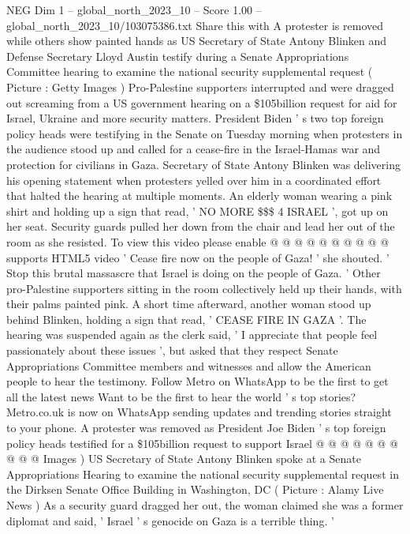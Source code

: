 \begin{textsample}{NEG Dim 1 – global\_north\_2023\_10 – Score 1.00 – global\_north\_2023\_10/103075386.txt}  \label{ex:f1_neg_315}
Share this with A protester is removed while others show painted hands as US Secretary of State Antony Blinken and Defense Secretary Lloyd Austin testify during a Senate Appropriations Committee hearing to examine the national security supplemental request ( Picture : Getty Images ) Pro-Palestine supporters interrupted and were dragged out screaming from a US government hearing on a \$105billion request for aid for Israel, Ukraine and more security matters.
President Biden ' s two top foreign policy heads were testifying in the Senate on Tuesday morning when protesters in the audience stood up and called for a cease-fire in the Israel-Hamas war and protection for civilians in Gaza.
Secretary of State Antony Blinken was delivering his opening statement when protesters yelled over him in a coordinated effort that halted the hearing at multiple moments.
An elderly woman wearing a pink shirt and holding up a sign that read, ' NO MORE \$\$\$ 4 ISRAEL ', got up on her seat.
Security guards pulled her down from the chair and lead her out of the room as she resisted.
To view this video please enable @ @ @ @ @ @ @ @ @ @ supports HTML5 video ' Cease fire now on the people of Gaza! ' she shouted. ' Stop this brutal massascre that Israel is doing on the people of Gaza. ' Other pro-Palestine supporters sitting in the room collectively held up their hands, with their palms painted pink.
A short time afterward, another woman stood up behind Blinken, holding a sign that read, ' CEASE FIRE IN GAZA '.
The hearing was suspended again as the clerk said, ' I appreciate that people feel passionately about these issues ', but asked that they respect Senate Appropriations Committee members and witnesses and allow the American people to hear the testimony.
Follow Metro on WhatsApp to be the first to get all the latest news Want to be the first to hear the world ' s top stories?
Metro.co.uk is now on WhatsApp sending updates and trending stories straight to your phone.
A protester was removed as President Joe Biden ' s top foreign policy heads testified for a \$105billion request to support Israel @ @ @ @ @ @ @ @ @ @ Images ) US Secretary of State Antony Blinken spoke at a Senate Appropriations Hearing to examine the national security supplemental request in the Dirksen Senate Office Building in Washington, DC ( Picture : Alamy Live News ) As a security guard dragged her out, the woman claimed she was a former diplomat and said, ' Israel ' s genocide on Gaza is a terrible thing. '

\end{textsample}
